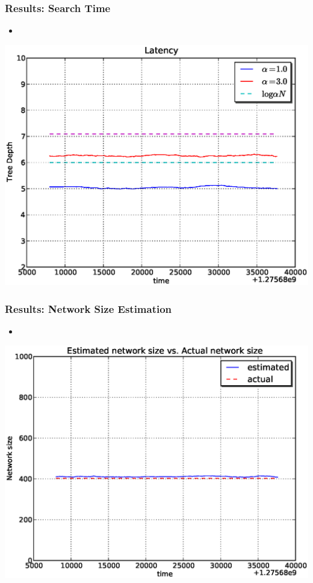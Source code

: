 \documentclass[red]{beamer}
\begin{document}
\begin{frame}
\frametitle{Results: Search Time}
\begin{itemize}
\item 
\end{itemize}
\begin{center}
\includegraphics[scale=0.4]{figs/plab_depth.eps}
\end{center}
\end{frame}

\begin{frame}
\frametitle{Results: Network Size Estimation}
\begin{itemize}
\item 
\end{itemize}
\begin{center}
\includegraphics[scale=0.4]{figs/plab_size.eps}
\end{center}
\end{frame}
\end{document}
